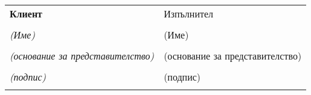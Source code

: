 
\mbox{}\vfill %
\begin{tabu}{X X} \tabucline{}
	\rowfont[c]\bfseries Клиент & Изпълнител \\
	[10pt]\makebox[8cm]{\hrulefill} & \makebox[8cm]{\hrulefill} \\
	\rowfont[c]\itshape (Име) & (Име) \\
	[10pt]\makebox[8cm]{\hrulefill} & \makebox[8cm]{\hrulefill} \\
	\rowfont[c]\itshape (основание за представителство) & (основание за представителство) \\
	[10pt]\makebox[8cm]{\hrulefill} & \makebox[8cm]{\hrulefill} \\
	\rowfont[c]\itshape (подпис) & (подпис) \\[4cm] \\
\end{tabu}
\pagebreak
